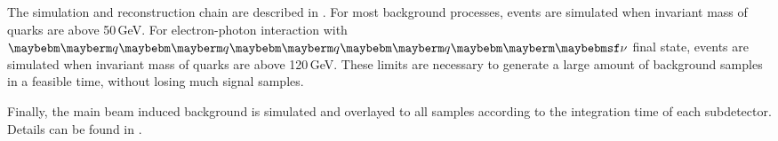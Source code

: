 


The simulation and reconstruction chain are described in . For most background processes, events are simulated when invariant mass of quarks are above 50\,GeV. For electron-photon interaction with $\Pquark\Pquark\Pquark\Pquark\Pnu$ final state, events are simulated when invariant mass of quarks are above 120\,GeV. These limits are necessary to generate a large amount of background samples in a feasible time, without losing much signal samples.

Finally, the main beam induced background \ggHad is simulated and overlayed to all samples according to the integration time of each subdetector. Details can be found in .

